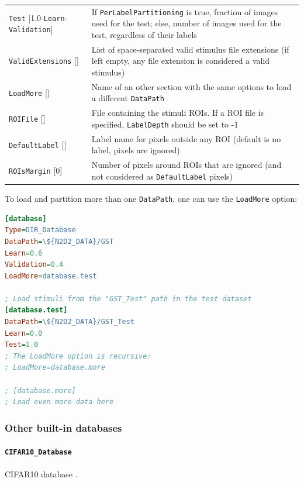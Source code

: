 \documentclass[a4paper,11pt,oneside]{article}
\begin{document}
\begin{center}
\begin{longtable}{| p{5cm} | p{10cm} | }
  \lstinline!Test! [1.0-\lstinline!Learn!-\lstinline!Validation!] & If
  \lstinline!PerLabelPartitioning! is true, fraction of images used for the
  test; else, number of images used for the test, regardless of their labels \\
  \lstinline!ValidExtensions! [] & List of space-separated valid stimulus file
  extensions (if left empty, any file extension is considered a valid stimulus)
  \\
  \lstinline!LoadMore! [] & Name of an other section with the same options to
  load a different \lstinline!DataPath! \\
 \hline
  \lstinline!ROIFile! [] & File containing the stimuli ROIs. If a ROI file is
   specified, \lstinline!LabelDepth! should be set to -1 \\
  \lstinline!DefaultLabel! [] & Label name for pixels outside any ROI (default
   is no label, pixels are ignored) \\
  \lstinline!ROIsMargin! [0] & Number of pixels around ROIs that are ignored
  (and not considered as \lstinline!DefaultLabel! pixels) \\
 \hline
\end{longtable}
\end{center}

To load and partition more than one \lstinline!DataPath!, one can use the
\lstinline!LoadMore! option:

\begin{lstlisting}[language=ini]
[database]
Type=DIR_Database
DataPath=\${N2D2_DATA}/GST
Learn=0.6
Validation=0.4
LoadMore=database.test

; Load stimuli from the "GST_Test" path in the test dataset
[database.test]
DataPath=\${N2D2_DATA}/GST_Test
Learn=0.0
Test=1.0
; The LoadMore option is recursive:
; LoadMore=database.more

; [database.more]
; Load even more data here
\end{lstlisting}


\subsubsection{Other built-in databases}

\paragraph{\texorpdfstring{%
\lstinline[basicstyle=\ttfamily\bfseries]!CIFAR10_Database!}{CIFAR10\_Database}}
CIFAR10 database \citep{Krizhevsky2009}.
\end{document}
